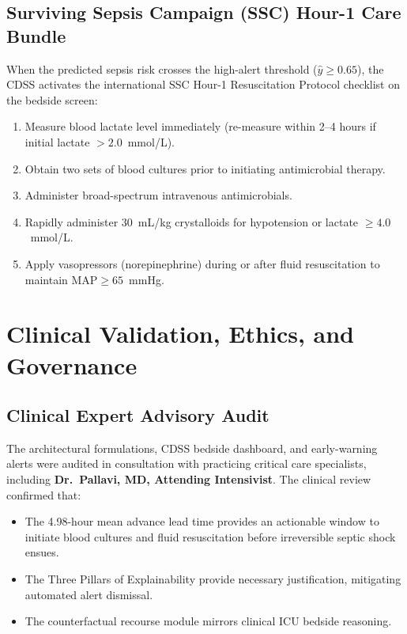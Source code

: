 \documentclass[final,5p,times,twocolumn]{elsarticle}
\begin{document}
\subsection{Surviving Sepsis Campaign (SSC) Hour-1 Care Bundle}
When the predicted sepsis risk crosses the high-alert threshold ($\hat{y} \ge 0.65$), the CDSS activates the international SSC Hour-1 Resuscitation Protocol checklist on the bedside screen:
\begin{enumerate}
    \item Measure blood lactate level immediately (re-measure within 2--4 hours if initial lactate $>2.0$~mmol/L).
    \item Obtain two sets of blood cultures prior to initiating antimicrobial therapy.
    \item Administer broad-spectrum intravenous antimicrobials.
    \item Rapidly administer $30$~mL/kg crystalloids for hypotension or lactate $\ge 4.0$~mmol/L.
    \item Apply vasopressors (norepinephrine) during or after fluid resuscitation to maintain $\text{MAP} \ge 65$~mmHg.
\end{enumerate}

\section{Clinical Validation, Ethics, and Governance}
\subsection{Clinical Expert Advisory Audit}
The architectural formulations, CDSS bedside dashboard, and early-warning alerts were audited in consultation with practicing critical care specialists, including \textbf{Dr.~Pallavi, MD, Attending Intensivist}. The clinical review confirmed that:
\begin{itemize}
    \item The 4.98-hour mean advance lead time provides an actionable window to initiate blood cultures and fluid resuscitation before irreversible septic shock ensues.
    \item The Three Pillars of Explainability provide necessary justification, mitigating automated alert dismissal.
    \item The counterfactual recourse module mirrors clinical ICU bedside reasoning.
\end{itemize}
\end{document}
